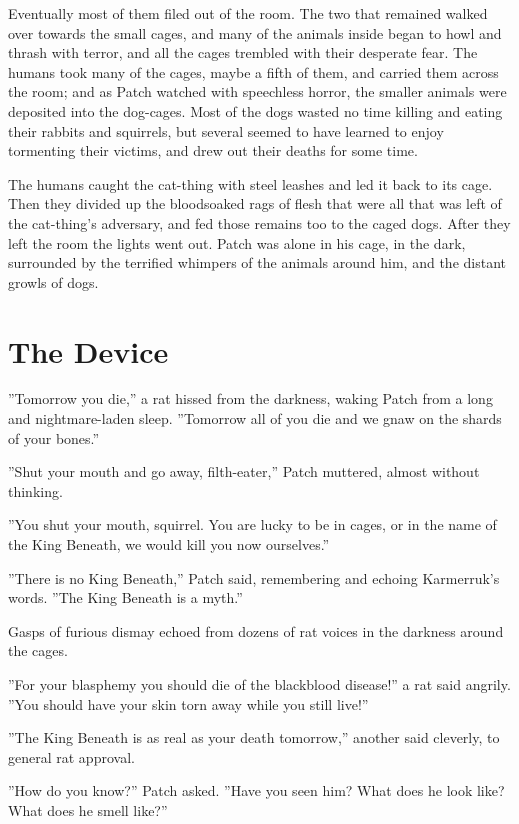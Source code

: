 \documentclass[12pt]{book}
\begin{document}
Eventually most of them filed out of the room. The two that remained walked over towards the small cages, and many of the animals inside began to howl and thrash with terror, and all the cages trembled with their desperate fear. The humans took many of the cages, maybe a fifth of them, and carried them across the room; and as Patch watched with speechless horror, the smaller animals were deposited into the dog-cages. Most of the dogs wasted no time killing and eating their rabbits and squirrels, but several seemed to have learned to enjoy tormenting their victims, and drew out their deaths for some time.

The humans caught the cat-thing with steel leashes and led it back to its cage. Then they divided up the bloodsoaked rags of flesh that were all that was left of the cat-thing's adversary, and fed those remains too to the caged dogs. After they left the room the lights went out. Patch was alone in his cage, in the dark, surrounded by the terrified whimpers of the animals around him, and the distant growls of dogs.


\section{The Device}

''Tomorrow you die,'' a rat hissed from the darkness, waking Patch from a long and nightmare-laden sleep. ''Tomorrow all of you die and we gnaw on the shards of your bones.''

''Shut your mouth and go away, filth-eater,'' Patch muttered, almost without thinking.

''You shut your mouth, squirrel. You are lucky to be in cages, or in the name of the King Beneath, we would kill you now ourselves.''

''There is no King Beneath,'' Patch said, remembering and echoing Karmerruk's words. ''The King Beneath is a myth.''

Gasps of furious dismay echoed from dozens of rat voices in the darkness around the cages.

''For your blasphemy you should die of the blackblood disease!'' a rat said angrily. ''You should have your skin torn away while you still live!''

''The King Beneath is as real as your death tomorrow,'' another said cleverly, to general rat approval.

''How do you know?'' Patch asked. ''Have you seen him? What does he look like? What does he smell like?''
\end{document}
